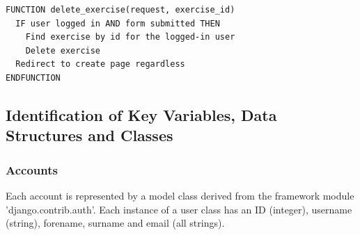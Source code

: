 \documentclass{article}
\begin{document}
\begin{lstlisting}[style=OCRPseudocode, caption={Exercise deletion view}]
  FUNCTION delete_exercise(request, exercise_id)
  IF user logged in AND form submitted THEN
    Find exercise by id for the logged-in user
    Delete exercise
  Redirect to create page regardless
ENDFUNCTION
\end{lstlisting}

\subsection{Identification of Key Variables, Data Structures and Classes}

\subsubsection{Accounts}

Each account is represented by a model class derived from the framework module 'django.contrib.auth'. Each instance of a user class has an ID (integer), username (string), forename, surname and email (all strings). 
\end{document}

